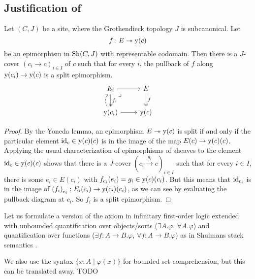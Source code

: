 \subsection{Justification of }

\begin{lemma}
  Let $(C, J)$ be a site,
  where the Grothendieck topology $J$ is subcanonical.
  Let
  \[ f : E \twoheadrightarrow \mathrm{y}(c) \]
  be an epimorphism in $\mathrm{Sh}(C, J)$ with representable codomain.
  Then there is a $J$-cover $(c_i \to c)_{i \in I}$ of $c$
  such that for every $i$,
  the pullback of $f$ along $\mathrm{y}(c_i) \to \mathrm{y}(c)$
  is a split epimorphism.
  \[ \begin{tikzcd}
    E_i \ar[r] \ar[d, two heads, "f_i"] \ar[dr, phantom, very near start, "\lrcorner"] &
    E \ar[d, two heads, "f"] \\
    \yo(c_i) \ar[r] \ar[u, bend left, dashed]&
    \yo(c)
  \end{tikzcd} \]
\end{lemma}

\begin{proof}
  By the Yoneda lemma,
  an epimorphism $E \twoheadrightarrow \mathrm{y}(c)$ is split
  if and only if
  the particular element $\mathrm{id}_c \in \mathrm{y}(c)(c)$
  is in the image of the map $E(c) \to \mathrm{y}(c)(c)$.
  Applying the usual characterization of epimorphisms of sheaves
  \cite[Corollary III.7.5]{maclane-moerdjik}
  to the element $\mathrm{id}_c \in \mathrm{y}(c)(c)$
  shows that there is a $J$-cover ${(c_i \xrightarrow{g_i} c)}_{i \in I}$
  such that for every $i \in I$,
  there is some $e_i \in E(c_i)$
  with $f_{c_i}(e_i) = g_i \in \mathrm{y}(c)(c_i)$.
  But this means that $\mathrm{id}_{c_i}$ is in the image of ${(f_i)}_{c_i} : E_i(c_i) \to \mathrm{y}(c_i)(c_i)$,
  as we can see by evaluating the pullback diagram at $c_i$.
  So $f_i$ is a split epimorphism.
\end{proof}

Let us formulate a version of the axiom 
in infinitary first-order logic extended with
unbounded quantification over objects/sorts
($\exists A. \varphi$, $\forall A. \varphi$)
and quantification over functions
($\exists f : A \to B. \varphi$, $\forall f : A \to B. \varphi$)
as in Shulmans stack semantics \cite[Section 7]{shulman-stack-semantics}.

We also use the syntax $\{x : A \mid \varphi(x)\}$
for bounded set comprehension,
but this can be translated away.
TODO

